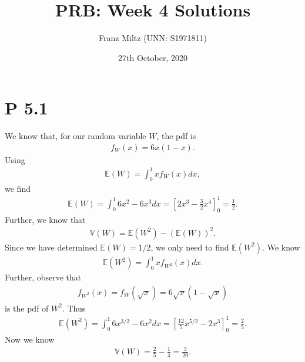 \documentclass{article}
\newcommand{\E}{\mathbb{E}}
\newcommand{\V}{\mathbb{V}}
\begin{document}
\title{PRB: Week 4 Solutions}
\author{Franz Miltz (UNN: S1971811)}
\date{27th October, 2020}
\maketitle
\section{P 5.1}
We know that, for our random variable $W$, the pdf is
\begin{align*}
  f_W(x) = 6x(1-x).
\end{align*}
Using
\begin{align*}
  \E(W) = \int_0^1 xf_W(x) dx,
\end{align*}
we find
\begin{align*}
  \E(W)=\int_0^1 6x^2-6x^3 dx = \left[2x^3 - \frac{3}{2}x^4\right]^1_0 = \frac{1}{2}.
\end{align*}
Further, we know that
\begin{align*}
  \V(W) = \E(W^2) - (\E(W))^2.
\end{align*}
Since we have determined $\E(W)=1/2$, we only need to find $\E(W^2)$. We know
\begin{align*}
  \E(W^2) = \int_0^1 x f_{W^2}(x)dx.
\end{align*}
Further, observe that
\begin{align*}
  f_{W^2}(x) = f_W\left(\sqrt{x}\right) = 6\sqrt{x}\left(1-\sqrt{x}\right)
\end{align*}
is the pdf of $W^2$. Thus
\begin{align*}
  \E(W^2) = \int_0^1 6 x^{3/2}-6x^2 dx = \left[\frac{12}{5}x^{5/2}-2x^3\right]_0^1=\frac{2}{5}.
\end{align*}
Now we know
\begin{align*}
  \V(W) = \frac{2}{5}-\frac{1}{4} = \frac{3}{20}.
\end{align*}
\end{document}
